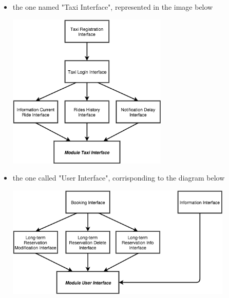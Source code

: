	\begin{itemize}
		\item the one named "Taxi Interface", represented in the image below
		    \begin{center}
			    \includegraphics[width=0.60\textwidth]{./images/ModuleTaxiInterface.png}~\\[1.5cm] 
			\end{center}
		\item the one called "User Interface", corrisponding to the diagram below
		    \begin{center}
			    \includegraphics[width=0.85\textwidth]{./images/ModuleUserInterface.png}~\\[1.5cm] 
			\end{center}
	\end{itemize}
